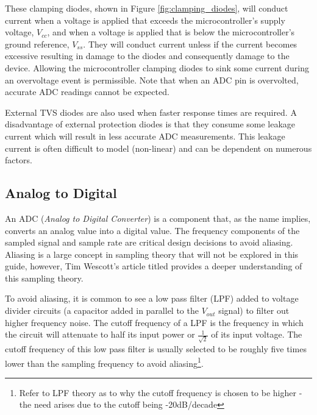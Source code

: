 \documentclass[main.tex]{subfiles}
\begin{document}
\noindent These clamping diodes, shown in Figure \ref{fig:clamping_diodes}, will conduct current when a voltage is applied that exceeds the microcontroller's supply voltage, $V_{cc}$, and when a voltage is applied that is below the microcontroller's ground reference, $V_{ss}$. They will conduct current unless if the current becomes excessive resulting in damage to the diodes and consequently damage to the device. Allowing the microcontroller clamping diodes to sink some current during an overvoltage event is permissible. Note that when an ADC pin is overvolted, accurate ADC readings cannot be expected. \newline

\newnoindentpara External TVS diodes are also used when faster response times are required. A disadvantage of external protection diodes is that they consume some leakage current which will result in less accurate ADC measurements. This leakage current is often difficult to model (non-linear) and can be dependent on numerous factors.

\subsection{Analog to Digital}
An ADC (\textit{Analog to Digital Converter}) is a component that, as the name implies, converts an analog value into a digital value. The frequency components of the sampled signal and sample rate are critical design decisions to avoid aliasing. Aliasing is a large concept in sampling theory that will not be explored in this guide, however, Tim Wescott's article titled  provides a deeper understanding of this sampling theory. \newline

\newnoindentpara To avoid aliasing, it is common to see a low pass filter (LPF) added to voltage divider circuits (a capacitor added in parallel to the $V_{out}$ signal) to filter out higher frequency noise. The cutoff frequency of a LPF is the frequency in which the circuit will attenuate to half its input power or $\frac{1}{\sqrt{2}}$ of its input voltage. The cutoff frequency of this low pass filter is usually selected to be roughly five times lower than the sampling frequency to avoid aliasing\footnote{Refer to LPF theory as to why the cutoff frequency is chosen to be higher - the need arises due to the cutoff being -20dB/decade}. 
\end{document}
